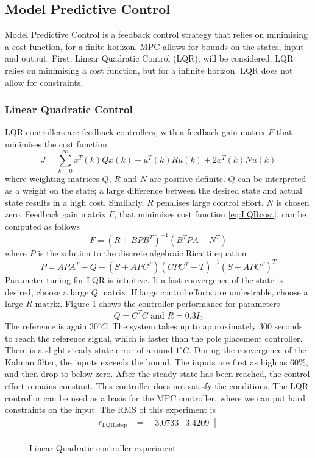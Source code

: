 \subsection{Model Predictive Control}
Model Predictive Control is a feedback control strategy that relies on minimising a cost function, for a finite horizon. MPC allows for bounds on the states, input and output. First, Linear Quadratic Control (LQR), will be considered. LQR relies on minimising a cost function, but for a infinite horizon. LQR does not allow for constraints.

\subsubsection{Linear Quadratic Control}
LQR controllers are feedback controllers, with a feedback gain matrix $F$ that minimises the cost function
\begin{equation}
    J = \sum_{k=0}^{\infty} x^T(k)Qx(k) + u^T(k)Ru(k) + 2x^T(k)Nu(k) \label{eq:LQRcost}
\end{equation}
where weighting matrices $Q$, $R$ and $N$ are positive definite. $Q$ can be interpreted as a weight on the state; a large difference between the desired state and actual state results in a high cost. Similarly, $R$ penalises large control effort. $N$ is chosen zero.
Feedback gain matrix $F$, that minimises cost function \ref{eq:LQRcost}, can be computed as follows
$$
F = (R+BPB^T)^{-1}(B^TPA+N^T)
$$
where $P$ is the solution to the discrete algebraic Ricatti equation
\begin{equation}
P = APA^T + Q - (S+APC^T)(CPC^T+T)^{-1}(S+APC^T)^T \label{eq:LQRricatti}
\end{equation}
Parameter tuning for LQR is intuitive. If a fast convergence of the state is desired, choose a large $Q$ matrix. If large control efforts are undesirable, choose a large $R$ matrix. Figure \ref{fig:LQR1} shows the controller performance for parameters
$$
Q = C^TC \text{ and } R = 0.3I_2
$$
The reference is again $30^{\circ}C$. The system takes up to approximately 300 seconds to reach the reference signal, which is faster than the pole placement controller. There is a slight steady state error of around  $1^{\circ}C$. During the convergence of the Kalman filter, the inputs exceeds the bound. The inputs are first as high as 60\%, and then drop to below zero. After the steady state has been reached, the control effort remains constant. This controller does not satisfy the conditions. The LQR controllor can be used as a basis for the MPC controller, where we can put hard constraints on the input. The RMS of this experiment is
\begin{align*}
    \epsilon_{\text{LQR,step}} &= \begin{bmatrix} 3.0733 & 3.4209\end{bmatrix}\\
\end{align*}
\begin{figure}[ht]
    \centering
    
    \caption{Linear Quadratic controller experiment}
    \label{fig:LQR1}
\end{figure}

